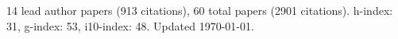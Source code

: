 14 lead author papers (913 citations),
60 total papers (2901 citations).\newline
h-index: 31, g-index: 53, i10-index: 48. Updated \today.